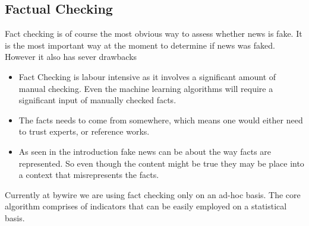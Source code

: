 \documentclass[10pt, a4paper, twocolumn]{article} %
\begin{document}
\subsection{Factual Checking}
Fact checking is of course the most obvious way to assess whether news is fake. It is the most important way at the moment to determine if news was faked. However it also has sever drawbacks
\begin{itemize}
\item Fact Checking is labour intensive as it involves a significant amount of manual checking. Even the machine learning algorithms will require a significant input of manually checked facts. 
\item The facts needs to come from somewhere, which means one would either need to trust experts, or reference works. 
\item As seen in the introduction fake news can be about the way facts are represented. So even though the content might be true they may be place into a context that misrepresents the facts.
\end{itemize}
Currently at bywire we are using fact checking only on an ad-hoc basis. The core algorithm comprises of indicators that can be easily employed on a statistical basis.
\end{document}
